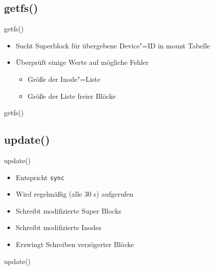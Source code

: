 \documentclass{beamer}
\begin{document}
\subsection{getfs()}

\begin{frame}{getfs()}
    \begin{itemize}
        \item Sucht Superblock für übergebene Device"=ID in mount Tabelle

        \bigskip

        \item Überprüft einige Werte auf mögliche Fehler
            \begin{itemize}
                \item Größe der Inode"=Liste
                \item Größe der Liste freier Blöcke
            \end{itemize}
    \end{itemize}
\end{frame}

\begin{frame}{getfs()}
\end{frame}




\subsection{update()}

\begin{frame}{update()}
    \begin{itemize}
        \item Entspricht \texttt{sync}
        \item Wird regelmäßig (alle 30 s) aufgerufen

        \bigskip

        \item Schreibt modifizierte Super Blocks
        \item Schreibt modifizierte Inodes
        \item Erzwingt Schreiben verzögerter Blöcke
    \end{itemize}
\end{frame}

\begin{frame}{update()}
\end{frame}
\end{document}
